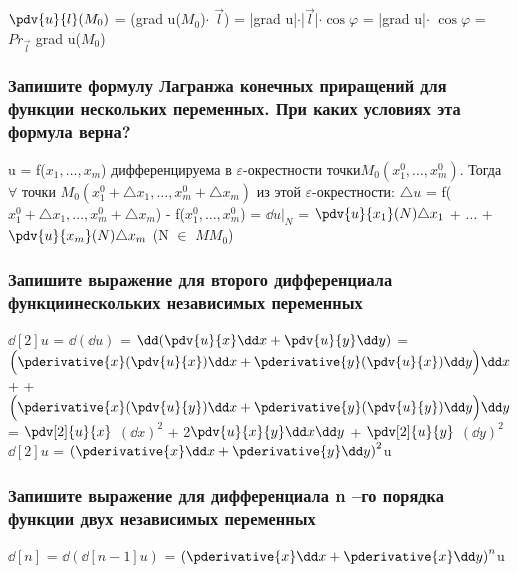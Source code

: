 \documentclass[a4paper, 12pt]{article}
\renewcommand{\phi}{\varphi}
\renewcommand{\epsilon}{\varepsilon}
\def\newline{}%
\begin{document}
            $\pdv{u}{l} (M_0)$ = (grad u($M_0$)$\cdot$ $\vec{l}$) = 
            |grad u|$\cdot$|$\vec{l}$|$\cdot \cos \phi$ = |grad u|$\cdot$
            $\cos \phi$ = $Pr_{\vec{l}}$ grad u($M_0$)

            \subsubsection{Запишите формулу Лагранжа конечных приращений для функции нескольких переменных. При каких условиях эта формула верна?}

            u = f($x_1, \ldots, x_m$) дифференцируема в $\epsilon$-окрестности
            точки\newline $M_0(x_1^0, \ldots, x_m^0)$.
            Тогда $\forall$ точки $M_0(x_1^0 + \triangle x_1, \ldots,
            x_m^0 + \triangle x_m)$ из этой $\epsilon$-окрестности:\newline
            $\triangle u$ = f($x_1^0 + \triangle x_1, \ldots, x_m^0 + \triangle x_m$)
            - f($x_1^0, \ldots, x_m^0$) = $\dd u|_{N}$ = 
            $\pdv{u}{x_1}(N) \triangle x_1$ + $\ldots$ + $\pdv{u}{x_m}(N) \triangle x_m$\newline
            (N $\in$ $MM_0$)

            \subsubsection{Запишите выражение для второго дифференциала функции\newline нескольких независимых переменных}

            $\dd[2] u$ = $\dd (\dd u)$ = $\dd (\pdv{u}{x} \dd x + \pdv{u}{y} \dd y)$ =
            $\Bigl(\pderivative{x}(\pdv{u}{x}) \dd x + \pderivative{y}(\pdv{u}{x})\dd y\Bigr) \dd x$ +\newline 
            + $\Bigl(\pderivative{x}(\pdv{u}{y})\dd x + \pderivative{y}(\pdv{u}{y})\dd y\Bigr) \dd y$ =
            $\pdv[2]{u}{x}$ ${(\dd x)}^2$ + 2$\pdv{u}{x}{y} \dd x \dd y$ + $\pdv[2]{u}{y}$ ${(\dd y)}^2$\newline
            $\dd[2] u$ = ${(\pderivative{x} \dd x + \pderivative{y} \dd y)}^2$u

            \subsubsection{Запишите выражение для дифференциала n –го порядка функции двух независимых переменных}

            $\dd[n]$ = $\dd (\dd[n-1] u)$ = ${(\pderivative{x} \dd x + \pderivative{x} \dd y)}^n$u
\end{document}
